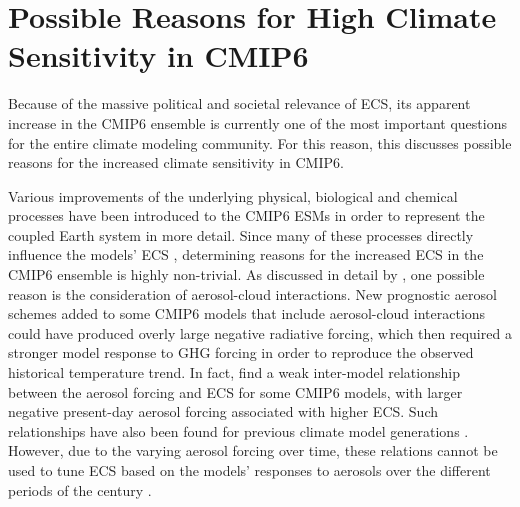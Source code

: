\section{Possible Reasons for High Climate Sensitivity in \acs{CMIP}6}
\label{sec:04:possible_reasons_high_ecs_cmip6}

Because of the massive political and societal relevance of \ac{ECS}, its
apparent increase in the \acs{CMIP}6 ensemble is currently one of the most
important questions for the entire climate modeling community. For this reason,
this  discusses possible
reasons for the increased climate sensitivity in \acs{CMIP}6.

Various improvements of the underlying physical, biological and chemical
processes have been introduced to the \acs{CMIP}6 \acp{ESM} in order to
represent the coupled Earth system in more detail. Since many of these
processes directly influence the models' \ac{ECS} \autocite{Forster2020},
determining reasons for the increased \ac{ECS} in the \acs{CMIP}6 ensemble is
highly non-trivial. As discussed in detail by \textcite{Meehl2020}, one
possible reason is the consideration of aerosol-cloud interactions. New
prognostic aerosol schemes added to some \acs{CMIP}6 models that include
aerosol-cloud interactions could have produced overly large negative radiative
forcing, which then required a stronger model response to \ac{GHG} forcing in
order to reproduce the observed historical temperature trend. In fact,
\textcite{Meehl2020} find a weak inter-model relationship between the aerosol
forcing and \ac{ECS} for some \acs{CMIP}6 models, with larger negative
present-day aerosol forcing associated with higher \ac{ECS}. Such relationships
have also been found for previous climate model generations
\autocite{Kiehl2007, Forster2013}. However, due to the varying aerosol forcing
over time, these relations cannot be used to tune \ac{ECS} based on the models'
responses to aerosols over the different periods of the  century
\autocite{Dittus2020}.

